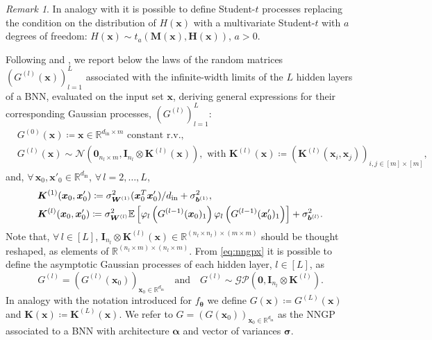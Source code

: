\documentclass[a4paper, 11pt, reqno]{amsart}
\newcommand{\citet}[2][]{\citeauthor{#2} \cite[#1]{#2}}
\theoremstyle{plain}
\theoremstyle{remark}
\newtheorem{remark}[theorem]{Remark}
\theoremstyle{definition}
\newcommand{\mean}[2][\kern-0.5pt]{\mathbb{E}_{#1}\left[#2\right]}
\newcommand{\normal}[2]{\mathcal{N}\left(#1, #2\right)}
\newcommand{\tstud}[3]{t_{#1}\left(#2, #3\right)}
\newcommand{\real}{\mathbb{R}}
\let\oldforall\forall
\renewcommand{\forall}{\oldforall\,}
\begin{document}
\begin{remark}
    In analogy with  it is possible to define Student-$t$ processes replacing the condition on the distribution of $H(\bm{x})$ with a multivariate Student-$t$ with $a$ degrees of freedom: $H(\bm{x}) \sim \tstud{a}{\bm{M}(\bm{x})}{\bm{H}(\bm{x})}$, $a > 0$.
\end{remark}

Following \citet{matthews2018} and \citet{lee2018}, we report below the laws of the random matrices $(G^{(l)}(\bm{x}))_{l = 1}^L$ associated with the infinite-width limits of the $L$ hidden layers of a BNN, evaluated on the input set $\bm{x}$, deriving general expressions for their corresponding Gaussian processes, $(G^{(l)})_{l = 1}^L$:
\begin{equation} \label{eq:nngpx}	
    \begin{aligned}
        & G^{(0)}(\bm{x}) \coloneqq \bm{x} \in \real^{d_{\mathrm{in}} \times m} \text{ constant r.v.}, \\
        & G^{(l)}(\bm{x}) \sim \normal{\bm{0}_{n_l \times m}}{\bm{I}_{n_l} \otimes \bm{K}^{(l)}(\bm{x})}, \text{ with } \bm{K}^{(l)}(\bm{x}) \coloneqq \left(\bm{K}^{(l)}(\bm{x}_i, \bm{x}_j)\right)_{i, j \in [m] \times [m]},
    \end{aligned}
\end{equation}
and, $\forall \bm{x}_0, \bm{x}'_0 \in \real^{d_{\mathrm{in}}}$, $\forall l = 2, \dots, L$, 
\begin{equation*}
    \begin{aligned}
        & \bm{K}^{(1)}(\bm{x}_0, \bm{x}'_0) \coloneqq \sigma_{\bm{W}^{(1)}}^2 (\bm{x}_0^T \bm{x}'_0) / d_{\mathrm{in}} + \sigma_{\bm{b}^{(1)}}^2, \\ 
        & \bm{K}^{(l)}(\bm{x}_0, \bm{x}'_0) \coloneqq \sigma_{\bm{W}^{(l)}}^2 \mean{\varphi_{l}\left(G^{(l - 1)}(\bm{x}_0)_1\right) \varphi_{l}\left(G^{(l - 1)}(\bm{x}'_0)_1\right)} + \sigma_{\bm{b}^{(l)}}^2.
    \end{aligned}
\end{equation*}
Note that, $\forall l \in [L]$, $\bm{I}_{n_l} \otimes \bm{K}^{(l)}(\bm{x}) \in \real^{(n_l \times n_l) \times (m \times m)}$ should be thought reshaped, as elements of $\real^{(n_l \times m) \times (n_l \times m)}$. From \cref{eq:nngpx} it is possible to define the asymptotic Gaussian processes of each hidden layer, $l \in [L]$, as
\begin{equation} \label{eq:nngp}
    G^{(l)} = (G^{(l)}(\bm{x}_0))_{\bm{x}_0 \in \real^{d_{\mathrm{in}}}} \quad \text{and} \quad G^{(l)} \sim \mathcal{GP}\left(\bm{0}, \bm{I}_{n_l} \otimes \bm{K}^{(l)}\right).
\end{equation}
In analogy with the notation introduced for $f_{\bm{\theta}}$ we define $G(\bm{x}) \coloneqq G^{(L)}(\bm{x})$ and $\bm{K}(\bm{x}) \coloneqq \bm{K}^{(L)}(\bm{x})$. We refer to $G = (G(\bm{x}_0))_{\bm{x}_0 \in \real^{d_{\mathrm{in}}}}$ as the NNGP associated to a BNN with architecture $\bm{\alpha}$ and vector of variances $\bm{\sigma}$.
\end{document}
